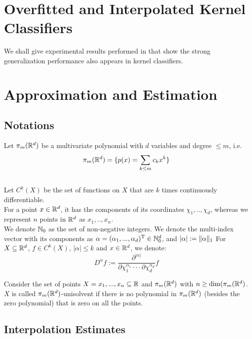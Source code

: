 \documentclass[twoside]{memoir}
\begin{document}
\chapter{Overfitted and Interpolated Kernel Classifiers}
We shall give experimental results performed in \cite{UnderstandKernel} that show the strong generalization performance also appears in kernel classifiers.
	
\chapter{Approximation and Estimation}
	\section{Notations} \label{sec:Notations}
	
	Let $\pi_m(\mathbb{R}^d)$ be a multivariate polynomial with $d$ variables and degree $\leq m$, i.e. 
	\[ \pi_m(\mathbb{R}^d) = \{ p(x) = \sum_{k \leq m} c_k x^k \} \] 	
	\\
	Let $C^k(X)$ be the set of functions on $X$ that are $k$ times continuously differentiable. \\
	For a point $x \in \mathbb{R}^d$, it has the components of its coordinates $\chi_1, .., \chi_d$, whereas we represent $n$ points in $\mathbb{R}^d$ as $x_1, .., x_n$.\\
	We denote $\mathbb{N}_0$ as the set of non-negative integers.
	We denote the multi-index vector with its components as $\alpha = (\alpha_1, ..., \alpha_d)^{\text{T}} \in \mathbb{N}_{0}^{d}$, and $|\alpha| := \lVert\alpha\rVert_1$ For $X \subseteq \mathbb{R}^d$, $f \in C^k(X)$, $|\alpha| \leq k$ and $x \in \mathbb{R}^d$, we denote:
	\[ D^\alpha f := \frac{\partial^{|\alpha|}}{\partial\chi_1^{\alpha_1} \cdot\cdot\cdot \partial\chi_d^{\alpha_d}} f \]
	
	\begin{defn}
		Consider the set of points $X = {x_1, ..., x_n} \subseteq \mathbb{R}$ and $\pi_m(\mathbb{R}^d)$ with $n \geq \dim(\pi_m(\mathbb{R}^d)$. $X$ is called $\pi_m(\mathbb{R}^d)$-unisolvent if there is no polynomial in $\pi_m(\mathbb{R}^d)$ (besides the zero polynomial) that is zero on all the points.
	\end{defn}

	
	\section{Interpolation Estimates}
	
\end{document}
